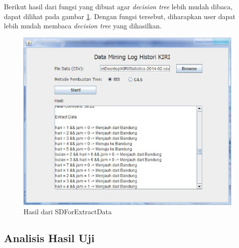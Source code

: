 

Berikut hasil dari fungsi yang dibuat agar \textsl{decision tree} lebih mudah dibaca, dapat dilihat pada gambar \ref{fig:percobaan3}. Dengan fungsi tersebut, diharapkan user dapat lebih mudah membaca \textsl{decision tree} yang dihasilkan.

\begin{figure}[H]
\centering
\includegraphics[scale=0.7]{Gambar/percobaan3.jpg}
\caption[Hasil dari SDForExtractData]{Hasil dari SDForExtractData} 
\label{fig:percobaan3}
\end{figure}

\subsection{Analisis Hasil Uji}

